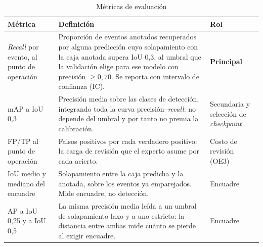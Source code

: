 \begin{table}[htbp]
    \centering
    \caption{Métricas de evaluación}
    \label{tab:metricas-sed}
    \small
    \begin{tabular}{@{}L{3.6cm}L{7.3cm}L{2.8cm}@{}}
        \toprule
        \textbf{Métrica}                                                 & \textbf{Definición} & \textbf{Rol} \\
        \midrule
        \textit{Recall} por evento, al punto de operación                &
        Proporción de eventos anotados recuperados por alguna predicción cuyo
        solapamiento con la caja anotada supera IoU 0,3, al umbral que la
        validación elige para ese modelo con precisión $\geq 0{,}70$. Se
        reporta con intervalo de confianza (IC).                              &
        \textbf{Principal}                                                                                    \\
        \addlinespace
        mAP a IoU 0,3                                                    &
        Precisión media sobre las clases de detección, integrando toda la curva
        precisión--\textit{recall}: no depende del umbral y por tanto no premia
        la calibración.                                                  &
        Secundaria y selección de \textit{checkpoint}                                                         \\
        \addlinespace
        FP/TP al punto de operación                                      &
        Falsos positivos por cada verdadero positivo: la carga de revisión que
        el experto asume por cada acierto.                               &
        Costo de revisión (OE3)                                                                               \\
        \addlinespace
        IoU medio y mediano del encuadre                                 &
        Solapamiento entre la caja predicha y la anotada, sobre los eventos ya
        emparejados. Mide encuadre, no detección.                        &
        Encuadre                                                                                              \\
        \addlinespace
        AP a IoU 0,25 y a IoU 0,5                                        &
        La misma precisión media leída a un umbral de solapamiento laxo y a uno
        estricto: la distancia entre ambas mide cuánto se pierde al exigir
        encuadre.                                                        &
        Encuadre                                                                                              \\

\end{tabular}
\end{table}
